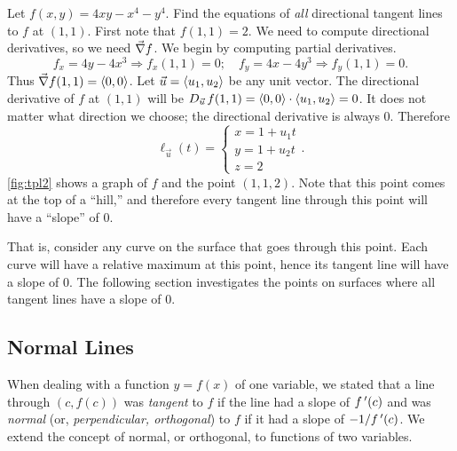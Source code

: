 \begin{example}\label{ex_tpl2}%
Let $f(x,y) = 4xy-x^4-y^4$. Find the equations of \emph{all} directional tangent lines to $f$ at $(1,1)$.
\solution
First note that $f(1,1) = 2$. We need to compute directional derivatives, so we need $\vec\nabla f$. We begin by computing partial derivatives.
\[
f_x = 4y-4x^3 \Rightarrow f_x(1,1) = 0;\quad f_y = 4x-4y^3\Rightarrow f_y(1,1) = 0.
\]
Thus $\vec\nabla f(1,1) =\left\langle 0,0\right\rangle$. Let $\vec u =\left\langle u_1,u_2\right\rangle$ be any unit vector. The directional derivative of $f$ at $(1,1)$ will be $D_{\vec u\,}f(1,1) =\left\langle 0,0\right\rangle\cdot\left\langle u_1,u_2\right\rangle= 0$. It does not matter what direction we choose; the directional derivative is always 0. Therefore
%
%
\[
\ell_{\vec u}(t) = \begin{cases}x= 1 +u_1t\\ y = 1+ u_2 t\\ z= 2\end{cases}.
\]
\autoref{fig:tpl2} shows a graph of $f$ and the point $(1,1,2)$. Note that this point comes at the top of a ``hill,'' and therefore every tangent line through this point will have a ``slope'' of 0. 

That is, consider any curve on the surface that goes through this point. Each curve will have a relative maximum at this point, hence its tangent line will have a slope of 0. The following section investigates the points on surfaces where all tangent lines have a slope of 0.
\end{example}

\subsection{Normal Lines}

When dealing with a function $y=f(x)$ of one variable, we stated that a line through $(c,f(c))$ was \emph{tangent} to $f$ if the line had a slope of $f\,'(c)$ and was \emph{normal} (or, \emph{perpendicular, orthogonal}) to $f$ if it had a slope of $-1/f\,'(c)$. We extend the concept of normal, or orthogonal, to functions of two variables. 

